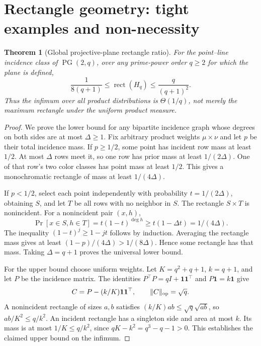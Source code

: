 \documentclass[11pt]{article}
\newtheorem{theorem}{Theorem}
\DeclareMathOperator{\rect}{rect}
\newcommand{\1}{\mathbf 1}
\begin{document}


\section{Rectangle geometry: tight examples and non-necessity}\label{sec:landscape}
\begin{samepage}
\begin{theorem}[Global projective-plane rectangle ratio]\label{thm:pgglobal}
For the point--line incidence class of $\operatorname{PG}(2,q)$, over any prime-power order $q\ge2$ for which the plane is defined,
\[
 \frac1{8(q+1)}\le\rect(H_q)\le\frac{q}{(q+1)^2}.
\]
Thus the infimum over \emph{all} product distributions is $\Theta(1/q)$, not merely the maximum rectangle under the uniform product measure.
\end{theorem}
\end{samepage}
\begin{proof}
We prove the lower bound for any bipartite incidence graph whose degrees on both sides are at most $\Delta\ge1$. Fix arbitrary product weights $\mu\times\nu$ and let $p$ be their total incidence mass. If $p\ge1/2$, some point has incident row mass at least $1/2$. At most $\Delta$ rows meet it, so one row has prior mass at least $1/(2\Delta)$. One of that row's two color classes has point mass at least $1/2$. This gives a monochromatic rectangle of mass at least $1/(4\Delta)$.

If $p<1/2$, select each point independently with probability $t=1/(2\Delta)$, obtaining $S$, and let $T$ be all rows with no neighbor in $S$. The rectangle $S\times T$ is nonincident. For a nonincident pair $(x,h)$,
\[
 \Pr[x\in S,h\in T]=t(1-t)^{\deg h}
 \ge t(1-\Delta t)=1/(4\Delta).
\]
The inequality $(1-t)^j\ge1-jt$ follows by induction. Averaging the rectangle mass gives at least $(1-p)/(4\Delta)>1/(8\Delta)$. Hence some rectangle has that mass. Taking $\Delta=q+1$ proves the universal lower bound.

For the upper bound choose uniform weights. Let $K=q^2+q+1$, $k=q+1$, and let $P$ be the incidence matrix. The identities $P^\top P=qI+\1\1^\top$ and $P\1=k\1$ give
\[
 C=P-(k/K)\1\1^\top,\qquad \|C\|_{\rm op}=\sqrt q.
\]
A nonincident rectangle of sizes $a,b$ satisfies $(k/K)ab\le\sqrt q\sqrt{ab}$, so $ab/K^2\le q/k^2$. An incident rectangle has a singleton side and area at most $k$. Its mass is at most $1/K\le q/k^2$, since $qK-k^2=q^3-q-1>0$. This establishes the claimed upper bound on the infimum.
\end{proof}
\end{document}
